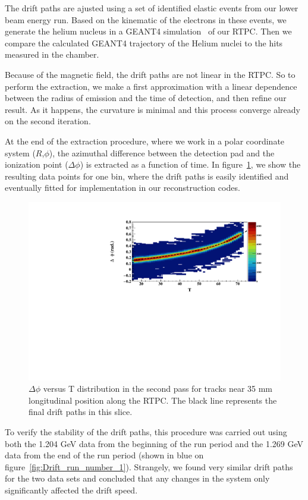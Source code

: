 \documentclass[twocolumn,showpacs,superscriptaddress,groupedaddress]{revtex4}
\begin{document}
The drift paths are ajusted using a set of identified elastic events 
from our lower beam energy run. Based on the kinematic of the electrons in
these events, we generate the helium nucleus in a GEANT4 
simulation~\cite{GEANT4} of our RTPC. Then we compare the calculated GEANT4 trajectory of 
the Helium nuclei to the hits measured in the chamber. 

Because of the 
magnetic field, the drift paths are not linear in the RTPC. So to perform the extraction, 
we make a first approximation with a linear dependence between the radius of 
emission and the time of detection, and then refine our result. As it happens, 
the curvature is minimal and this process converge already on the second 
iteration. 

At the end of the extraction procedure, where we work in a polar coordinate 
system ($R$,$\phi$), the azimuthal difference between the detection pad and 
the ionization point ($\Delta\phi$) is extracted as a function of time. 
In figure~\ref{fig:DELTA_PHI_TDC}, we show the resulting data points for one 
bin, where the drift paths is easily identified and eventually fitted for 
implementation in our reconstruction codes.

\begin{figure}[tb]
\centering
\includegraphics[scale=0.42]{fig_2017/FitResult_p2_11.pdf}
\caption{$\Delta \phi$ versus T distribution in the second pass for tracks
near 35 mm longitudinal position along the RTPC. The black line represents 
the final drift paths in this slice.}
\label{fig:DELTA_PHI_TDC}
\end{figure}

To verify the stability of the drift paths, this procedure was carried out 
using both the 1.204 GeV data from the beginning of the run period and the 
1.269 GeV data from the end of the run period (shown in blue on 
figure~\ref{fig:Drift_run_number_1}). Strangely, we found very similar drift paths
for the two data sets and concluded that any changes in the system only
significantly affected the drift speed.
\end{document}
